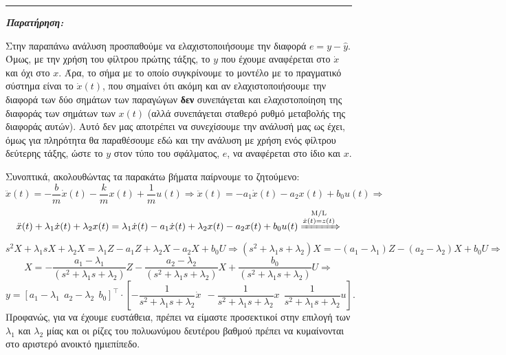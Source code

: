 \documentclass[12pt]{article} %
\numberwithin{equation}{section}  %
\begin{document}
\hrule

\vspace{+10pt}

\noindent\textit{\textbf{Παρατήρηση:}} 

Στην παραπάνω ανάλυση προσπαθούμε να ελαχιστοποιήσουμε την διαφορά $e = y - \hat{y}$. Όμως, με την χρήση του φίλτρου πρώτης τάξης, το $y$ που έχουμε αναφέρεται στο $\dot{x}$ και όχι στο $x$. Άρα, το σήμα με το οποίο συγκρίνουμε το μοντέλο με το πραγματικό σύστημα είναι το $\dot{x}(t)$, που σημαίνει ότι ακόμη και αν ελαχιστοποιήσουμε την διαφορά των δύο σημάτων των παραγώγων \textbf{δεν} συνεπάγεται και ελαχιστοποίηση της διαφοράς των σημάτων των $x(t)$ (αλλά συνεπάγεται σταθερό ρυθμό μεταβολής της διαφοράς αυτών). Αυτό δεν μας αποτρέπει να συνεχίσουμε την ανάλυσή μας ως έχει, όμως για πληρότητα θα παραθέσουμε εδώ και την ανάλυση με χρήση ενός φίλτρου δεύτερης τάξης, ώστε το $y$ στον τύπο του σφάλματος, $e$, να αναφέρεται στο ίδιο και $x$.

\vspace{+5pt}

Συνοπτικά, ακολουθώντας τα παρακάτω βήματα παίρνουμε το ζητούμενο:
$$\ddot{x}(t) = - \frac{b}{m} \dot{x}(t) - \frac{k}{m} x(t) + \frac{1}{m} u(t) \Rightarrow 
\ddot{x}(t) = - a_1 \dot{x}(t) - a_2 x(t) + b_0 u(t) \Rightarrow$$
$$\ddot{x}(t) + \lambda_1 \dot{x}(t) + \lambda_2 x(t)= \lambda_1 \dot{x}(t) - a_1 \dot{x}(t) + \lambda_2 x(t) - a_2 x(t) + b_0 u(t) 
\xRightarrow{\substack{\text{M/L} \\ \dot{x}(t) = z(t)}}$$
$$s^2 X + \lambda_1 s X + \lambda_2 X= \lambda_1 Z - a_1 Z + \lambda_2 X - a_2 X+ b_0 U \Rightarrow
(s^2 + \lambda_1 s + \lambda_2) X= -(a_1 - \lambda_1) Z - (a_2 -\lambda_2) X+ b_0 U \Rightarrow$$
$$X = - \frac{a_1 - \lambda_1}{(s^2 + \lambda_1 s + \lambda_2)} Z - \frac{a_2 - \lambda_2}{(s^2 + \lambda_1 s + \lambda_2)} X+ \frac{b_0}{(s^2 + \lambda_1 s + \lambda_2)} U \Rightarrow$$
$$y = [a_1 - \lambda_1 \ \ a_2 - \lambda_2 \ \ b_0]^{\top} \cdot \left[ -\frac{1}{s^2 + \lambda_1 s + \lambda_2} \dot{x} \ \ -\frac{1}{s^2 + \lambda_1 s + \lambda_2} x \ \ \frac{1}{s^2 + \lambda_1 s + \lambda_2} u \right].$$
Προφανώς, για να έχουμε ευστάθεια, πρέπει να είμαστε προσεκτικοί στην επιλογή των $\lambda_1$ και $\lambda_2$ μίας και οι ρίζες του πολυωνύμου δευτέρου βαθμού πρέπει να κυμαίνονται στο αριστερό ανοικτό ημιεπίπεδο.  
\end{document}
